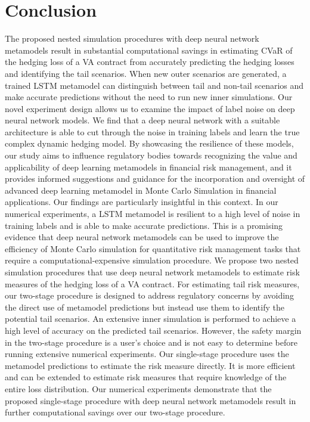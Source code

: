 \documentclass{article}
\begin{document}
\section{Conclusion} \label{sec:conclusion}
The proposed nested simulation procedures with deep neural network metamodels result in substantial computational savings in estimating CVaR of the hedging loss of a VA contract from accurately predicting the hedging losses and identifying the tail scenarios.
When new outer scenarios are generated, a trained LSTM metamodel can distinguish between tail and non-tail scenarios and make accurate predictions without the need to run new inner simulations.
Our novel experiment design allows us to examine the impact of label noise on deep neural network models.
We find that a deep neural network with a suitable architecture is able to cut through the noise in training labels and learn the true complex dynamic hedging model.
By showcasing the resilience of these models, our study aims to influence regulatory bodies towards recognizing the value and applicability of deep learning metamodels in financial risk management, and it provides informed suggestions and guidance for the incorporation and oversight of advanced deep learning metamodel in Monte Carlo Simulation in financial applications.
Our findings are particularly insightful in this context.
In our numerical experiments, a LSTM metamodel is resilient to a high level of noise in training labels and is able to make accurate predictions. 
This is a promising evidence that deep neural network metamodels can be used to improve the efficiency of Monte Carlo simulation for quantitative risk management tasks that require a computational-expensive simulation procedure.
We propose two nested simulation procedures that use deep neural network metamodels to estimate risk measures of the hedging loss of a VA contract.
For estimating tail risk measures, our two-stage procedure is designed to address regulatory concerns by avoiding the direct use of metamodel predictions but instead use them to identify the potential tail scenarios.
An extensive inner simulation is performed to achieve a high level of accuracy on the predicted tail scenarios.
However, the safety margin in the two-stage procedure is a user's choice and is not easy to determine before running extensive numerical experiments.
Our single-stage procedure uses the metamodel predictions to estimate the risk measure directly.
It is more efficient and can be extended to estimate risk measures that require knowledge of the entire loss distribution.
Our numerical experiments demonstrate that the proposed single-stage procedure with deep neural network metamodels result in further computational savings over our two-stage procedure. 
\end{document}
